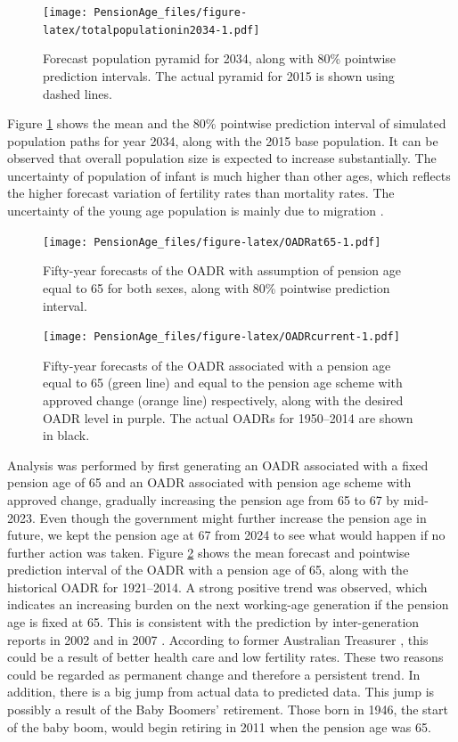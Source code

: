 \documentclass[11pt,a4paper,]{article}
\begin{document}
\begin{figure}
\centering
\texttt{[image: PensionAge\_files/figure-latex/totalpopulationin2034-1.pdf]}
\caption{\label{fig:totalpopulationin2034}Forecast population pyramid for 2034, along with 80\% pointwise prediction intervals. The actual pyramid for 2015 is shown using dashed lines.}
\end{figure}

Figure \ref{fig:totalpopulationin2034} shows the mean and the 80\% pointwise prediction interval of simulated population paths for year 2034, along with the 2015 base population. It can be observed that overall population size is expected to increase substantially. The uncertainty of population of infant is much higher than other ages, which reflects the higher forecast variation of fertility rates than mortality rates. The uncertainty of the young age population is mainly due to migration \autocite{HB08}.

\begin{figure}
\centering
\texttt{[image: PensionAge\_files/figure-latex/OADRat65-1.pdf]}
\caption{\label{fig:OADRat65}Fifty-year forecasts of the OADR with assumption of pension age equal to 65 for both sexes, along with 80\% pointwise prediction interval.}
\end{figure}

\begin{figure}
\centering
\texttt{[image: PensionAge\_files/figure-latex/OADRcurrent-1.pdf]}
\caption{\label{fig:OADRcurrent}Fifty-year forecasts of the OADR associated with a pension age equal to 65 (green line) and equal to the pension age scheme with approved change (orange line) respectively, along with the desired OADR level in purple. The actual OADRs for 1950--2014 are shown in black.}
\end{figure}

Analysis was performed by first generating an OADR associated with a fixed pension age of 65 and an OADR associated with pension age scheme with approved change, gradually increasing the pension age from 65 to 67 by mid-2023. Even though the government might further increase the pension age in future, we kept the pension age at 67 from 2024 to see what would happen if no further action was taken. Figure \ref{fig:OADRat65} shows the mean forecast and pointwise prediction interval of the OADR with a pension age of 65, along with the historical OADR for 1921--2014. A strong positive trend was observed, which indicates an increasing burden on the next working-age generation if the pension age is fixed at 65. This is consistent with the prediction by inter-generation reports in 2002 \autocite{IGR02} and in 2007 \autocite{IGR07}. According to former Australian Treasurer \textcite{Costello04}, this could be a result of better health care and low fertility rates. These two reasons could be regarded as permanent change and therefore a persistent trend. In addition, there is a big jump from actual data to predicted data. This jump is possibly a result of the Baby Boomers' retirement. Those born in 1946, the start of the baby boom, would begin retiring in 2011 when the pension age was 65.
\end{document}

